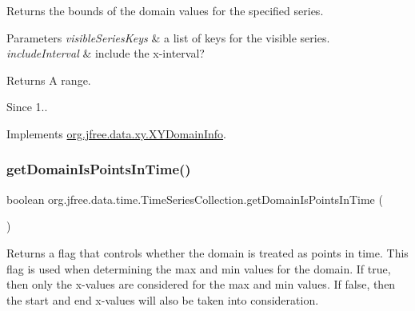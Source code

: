 Returns the bounds of the domain values for the specified series.


\begin{DoxyParams}{Parameters}
{\em visible\+Series\+Keys} & a list of keys for the visible series. \\
\hline
{\em include\+Interval} & include the x-\/interval?\\
\hline
\end{DoxyParams}
\begin{DoxyReturn}{Returns}
A range.
\end{DoxyReturn}
\begin{DoxySince}{Since}
1.. 
\end{DoxySince}


Implements \mbox{\hyperlink{interfaceorg_1_1jfree_1_1data_1_1xy_1_1_x_y_domain_info_a04cc3e726daf9493e6f87f6d789be17d}{org.\+jfree.\+data.\+xy.\+X\+Y\+Domain\+Info}}.

\mbox{\label{classorg_1_1jfree_1_1data_1_1time_1_1_time_series_collection_a124a5c005c8620703bfc2666fd2c83ea}} 
\subsubsection{\texorpdfstring{get\+Domain\+Is\+Points\+In\+Time()}{getDomainIsPointsInTime()}}
{\footnotesize\ttfamily boolean org.\+jfree.\+data.\+time.\+Time\+Series\+Collection.\+get\+Domain\+Is\+Points\+In\+Time (\begin{DoxyParamCaption}{ }\end{DoxyParamCaption})}

Returns a flag that controls whether the domain is treated as \textquotesingle{}points in time\textquotesingle{}. This flag is used when determining the max and min values for the domain. If {\ttfamily true}, then only the x-\/values are considered for the max and min values. If {\ttfamily false}, then the start and end x-\/values will also be taken into consideration.

